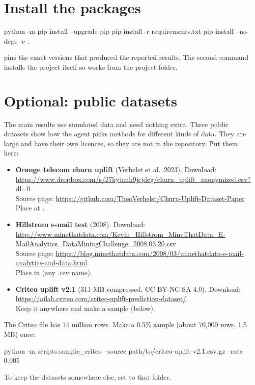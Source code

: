 \documentclass[11pt]{article}
\begin{document}
\section{Install the packages}
\begin{shell}
python -m pip install --upgrade pip
pip install -r requirements.txt
pip install --no-deps -e .
\end{shell}
 pins the exact versions that produced the reported results. The second command installs the project itself so  works from the project folder.

\section{Optional: public datasets}
\label{op:data}
The main results use simulated data and need nothing extra. Three public datasets show how the agent picks methods for different kinds of data. They are large and have their own licences, so they are not in the repository. Put them here:

\begin{itemize}
\item \textbf{Orange telecom churn uplift} (Verhelst et al.\ 2023). Download: \url{https://www.dropbox.com/s/27kyinnh9jcjdcg/churn_uplift_anonymized.csv?dl=0}\\
Source page: \url{https://github.com/TheoVerhelst/Churn-Uplift-Dataset-Paper}\\
Place at .
\item \textbf{Hillstrom e-mail test} (2008). Download: \url{http://www.minethatdata.com/Kevin_Hillstrom_MineThatData_E-MailAnalytics_DataMiningChallenge_2008.03.20.csv}\\
Source page: \url{https://blog.minethatdata.com/2008/03/minethatdata-e-mail-analytics-and-data.html}\\
Place in  (any .csv name).
\item \textbf{Criteo uplift v2.1} (311 MB compressed, CC BY-NC-SA 4.0). Download: \url{https://ailab.criteo.com/criteo-uplift-prediction-dataset/}\\
Keep it anywhere and make a sample (below).
\end{itemize}

The Criteo file has 14 million rows. Make a 0.5\% sample (about 70{,}000 rows, 1.5 MB) once:
\begin{shell}
python -m scripts.sample_criteo --source path/to/criteo-uplift-v2.1.csv.gz --rate 0.005
\end{shell}
To keep the datasets somewhere else, set  to that folder.
\end{document}
